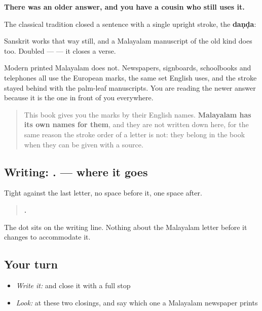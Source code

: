 \begin{culture}
\textbf{There was an older answer, and you have a cousin who still uses it.}

The classical tradition closed a sentence with a single upright stroke, the \textbf{daṇḍa}:

\begin{quote}
\end{quote}

Sanskrit works that way still, and a Malayalam manuscript of the old kind does too. Doubled —  — it closes a verse.

Modern printed Malayalam does not. Newspapers, signboards, schoolbooks and telephones all use the European marks, the same set English uses, and the stroke stayed behind with the palm-leaf manuscripts. You are reading the newer answer because it is the one in front of you everywhere.

\begin{quote}
This book gives you the marks by their English names. \textbf{Malayalam has its own names for them}, and they are not written down here, for the same reason the stroke order of a letter is not: they belong in the book when they can be given with a source.
\end{quote}
\end{culture}

\subsection*{Writing: . — where it goes}
Tight against the last letter, no space before it, one space after.

\begin{quote}
\textbf{ .}
\end{quote}

The dot sits on the writing line. Nothing about the Malayalam letter before it changes to accommodate it.

\subsection*{Your turn}
\begin{itemize}
\raggedright
  \item \emph{Write it:} \textbf{ } and close it with a full stop
  \item \emph{Look:} at these two closings, and say which one a Malayalam newspaper prints
\end{itemize}

